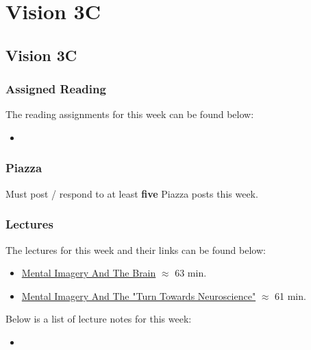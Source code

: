 \clearpage

\renewcommand{\ChapTitle}{Vision 3C}
\renewcommand{\SectionTitle}{Vision 3C}

\chapter{\ChapTitle}
\section{\SectionTitle}

\subsection{Assigned Reading}

The reading assignments for this week can be found below:

\begin{itemize}
    \item {}
\end{itemize}

\subsection{Piazza}

Must post / respond to at least \textbf{five} Piazza posts this week.

\subsection{Lectures}

The lectures for this week and their links can be found below:

\begin{itemize}
    \item \href{https://www.youtube.com/watch?v=wd84A__AotM}{Mental Imagery And The Brain} $\approx$ 63 min.
    \item \href{https://www.youtube.com/watch?v=eMQgEd50_Cc}{Mental Imagery And The "Turn Towards Neuroscience"} $\approx$ 61 min.
\end{itemize}

\noindent Below is a list of lecture notes for this week:

\begin{itemize}
    \item {}
\end{itemize}

